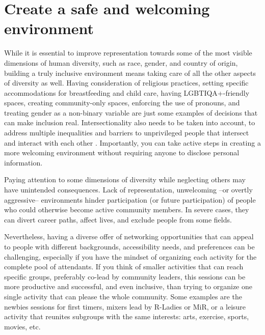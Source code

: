 \documentclass[10pt,letterpaper]{article}
\begin{document}
\section{Create a safe and welcoming environment}
\label{rule_inclusion}

While it is essential to improve representation towards some of the most visible dimensions of human diversity, such as race, gender, and country of origin, building a truly inclusive environment means taking care of all the other aspects of diversity as well. Having consideration of religious practices, setting specific accommodations for breastfeeding and child care, having LGBTIQA+-friendly spaces, creating community-only spaces, enforcing the use of pronouns, and treating gender as a non-binary variable are just some examples of decisions that can make inclusion real. Intersectionality also needs to be taken into account, to address multiple inequalities and barriers to unprivileged people that intersect and interact with each other \cite{crenshaw1989}. Importantly, you can take active steps in creating a more welcoming environment without requiring anyone to disclose personal information.

Paying attention to some dimensions of diversity while neglecting others may have unintended consequences. Lack of representation, unwelcoming --or overtly aggressive-- environments hinder participation (or future participation) of people who could otherwise become active community members. In severe cases, they can divert career paths, affect lives, and exclude people from some fields. %

Nevertheless, having a diverse offer of networking opportunities that can appeal to people with different backgrounds, accessibility needs, and preferences can be challenging, especially if you have the mindset of organizing each activity for the complete pool of  attendants. If you think of smaller activities that can reach specific groups, preferably co-lead by community leaders, this sessions can be more productive and successful, and even inclusive, than trying to organize one single activity that can please the whole community. Some examples are the newbies sessions for first timers, mixers lead by R-Ladies or MiR, or a leisure activity that reunites subgroups with the same interests: arts, exercise, sports, movies, etc.
\end{document}
